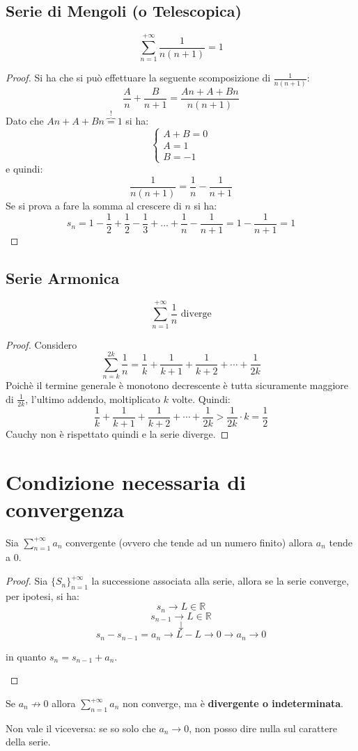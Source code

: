 \documentclass[a4paper,12pt, oneside]{book}
\begin{document}
\subsection{Serie di Mengoli (o Telescopica)}
$$\sum_{n=1}^{+\infty} \frac{1}{n(n+1)} = 1$$
\begin{proof} Si ha che si può effettuare la seguente scomposizione di
  $\frac{1}{n(n+1)}$:
  $$\frac{A}{n}+\frac{B}{n+1}=\frac{An+A+Bn}{n(n+1)}$$
  Dato che $An+A+Bn \overbrace{=}^{!} 1$ si ha:
  $$\left\{
    \begin{array}{ll} A+B=0 \\ A=1 \\ B=-1
    \end{array} \right.$$ e
  quindi: $$\frac{1}{n(n+1)}=\frac{1}{n}-\frac{1}{n+1}$$ Se si prova a fare la
  somma al crescere di $n$ si
  ha:$$s_n=1-\frac{1}{2}+\frac{1}{2}-\frac{1}{3}+...+\frac{1}{n}-\frac{1}{n+1}=1-\frac{1}{n+1}=1$$
\end{proof}
\subsection{Serie Armonica}
$$\sum_{n=1}^{+\infty} \frac{1}{n} \mbox{ diverge}$$
\begin{proof}
  Considero $$\sum_{n=k}^{2k}\frac{1}{n}=\frac{1}{k}+\frac{1}{k+1}+\frac{1}{k+2}+\cdots+\frac{1}{2k}$$
  Poichè il termine generale è monotono decrescente è tutta sicuramente maggiore
  di $\frac{1}{2k}$, l'ultimo addendo, moltiplicato $k$ volte. Quindi:
  $$\frac{1}{k}+\frac{1}{k+1}+\frac{1}{k+2}+\cdots+\frac{1}{2k}>\frac{1}{2k}\cdot k=	\frac{1}{2}$$
  Cauchy non è rispettato quindi e la serie diverge.
\end{proof}
\section{Condizione necessaria di convergenza}
\begin{teorema} Sia $\sum_{n=1}^{+\infty} a_n$ convergente (ovvero che tende ad
  un numero finito) allora $a_n$ tende a $0$.
\end{teorema}
\begin{proof} Sia ${\{S_n\}}_{n=1}^{+\infty}$ la successione associata alla
  serie, allora se la serie converge, per ipotesi, si ha:
  $$s_n \rightarrow L\in \mathbb{R}$$
  $$s_{n-1} \rightarrow L\in \mathbb{R}$$
  $$\downarrow$$
  $$s_n-s_{n-1}=a_n\rightarrow L-L\rightarrow 0 \longrightarrow a_n \rightarrow 0$$
  \begin{center}in quanto $s_n=s_{n-1}+a_n$.\end{center}
\end{proof}
\begin{nota} Se $a_n\not\rightarrow 0$ allora $\sum_{n=1}^{+\infty} a_n$ non
  converge, ma è \textbf{divergente o indeterminata}.
\end{nota}
\begin{nota} Non vale il viceversa: se so solo che $a_n\rightarrow 0$, non posso
  dire nulla sul carattere della serie.
\end{nota}
\end{document}
